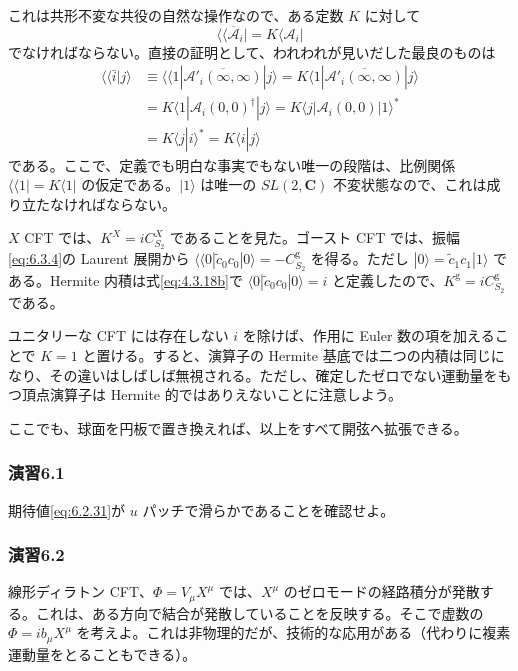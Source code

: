 これは共形不変な共役の自然な操作なので、ある定数 $K$ に対して
\begin{equation}
\langle\!\langle\overline{\mathcal A}_i|=K\langle\mathcal A_i|
\tag{6.7.32}\label{eq:6.7.32}
\end{equation}
でなければならない。直接の証明として、われわれが見いだした最良のものは
\begin{equation}
\begin{aligned}
\langle\!\langle\bar i|j\rangle
&\equiv\langle\!\langle1|
\overline{\mathcal A'_i(\infty,\infty)}|j\rangle
=K\langle1|\overline{\mathcal A'_i(\infty,\infty)}|j\rangle\\
&=K\langle1|\mathcal A_i(0,0)^\dagger|j\rangle
=K\langle j|\mathcal A_i(0,0)|1\rangle^*\\
&=K\langle j|i\rangle^*
=K\langle i|j\rangle
\end{aligned}
\tag{6.7.33}\label{eq:6.7.33}
\end{equation}
である。ここで、定義でも明白な事実でもない唯一の段階は、比例関係 $\langle\!\langle1|=K\langle1|$ の仮定である。$|1\rangle$ は唯一の $SL(2,\mathbf C)$ 不変状態なので、これは成り立たなければならない。

$X$ CFT では、$K^X=iC^X_{S_2}$ であることを見た。ゴースト CFT では、振幅\eqref{eq:6.3.4}の Laurent 展開から
$\langle\!\langle0|\widetilde c_0c_0|0\rangle=-C^{\mathrm g}_{S_2}$
を得る。ただし $|0\rangle=\widetilde c_1c_1|1\rangle$ である。Hermite 内積は式\eqref{eq:4.3.18b}で
$\langle0|\widetilde c_0c_0|0\rangle=i$
と定義したので、$K^{\mathrm g}=iC^{\mathrm g}_{S_2}$ である。

ユニタリーな CFT には存在しない $i$ を除けば、作用に Euler 数の項を加えることで $K=1$ と置ける。すると、演算子の Hermite 基底では二つの内積は同じになり、その違いはしばしば無視される。ただし、確定したゼロでない運動量をもつ頂点演算子は Hermite 的ではありえないことに注意しよう。

ここでも、球面を円板で置き換えれば、以上をすべて開弦へ拡張できる。


\subsubsection*{演習6.1}\label{ex:6.1}
期待値\eqref{eq:6.2.31}が $u$ パッチで滑らかであることを確認せよ。

\subsubsection*{演習6.2}\label{ex:6.2}
線形ディラトン CFT、$\Phi=V_\mu X^\mu$ では、$X^\mu$ のゼロモードの経路積分が発散する。これは、ある方向で結合が発散していることを反映する。そこで虚数の $\Phi=ib_\mu X^\mu$ を考えよ。これは非物理的だが、技術的な応用がある（代わりに複素運動量をとることもできる）。

